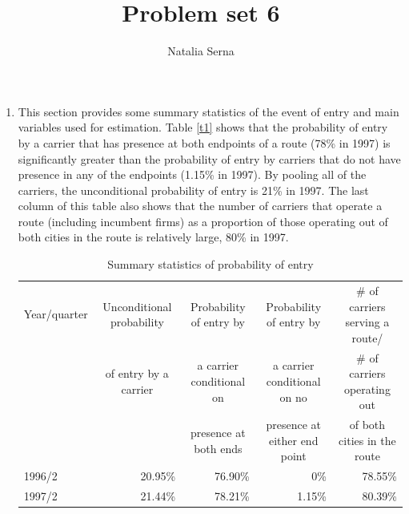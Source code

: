 \documentclass[12pt,english]{article}
\author{
Natalia Serna
   }
\title{Problem set 6}
\date{}
\begin{document}
\maketitle


\begin{enumerate}

\item This section provides some summary statistics of the event of entry and main variables used for estimation. Table \eqref{t1} shows that the probability of entry by a carrier that has presence at both endpoints of a route (78\% in 1997) is significantly greater than the probability of entry by carriers that do not have presence in any of the endpoints (1.15\% in 1997). By pooling all of the carriers, the unconditional probability of entry is 21\% in 1997. The last column of this table also shows that the number of carriers that operate a route (including incumbent firms) as a proportion of those operating out of both cities in the route is relatively large, 80\% in 1997.


\begin{table}[H]
  \centering
  \caption{Summary statistics of probability of entry}
    \begin{tabular}{lrrrr}
    \hline
    \multicolumn{1}{c}{\scriptsize{Year/quarter}} & \multicolumn{1}{c}{\scriptsize{Unconditional probability}} & \multicolumn{1}{c}{\scriptsize{Probability of entry by}} & \multicolumn{1}{c}{\scriptsize{Probability of entry by}} & \multicolumn{1}{c}{\scriptsize{\# of carriers serving a route/}} \\
        \multicolumn{1}{c}{} & \multicolumn{1}{c}{\scriptsize{of entry by a carrier}} & \multicolumn{1}{c}{\scriptsize{a carrier conditional on}} & \multicolumn{1}{c}{\scriptsize{a carrier conditional on no}} & \multicolumn{1}{c}{\scriptsize{\# of carriers operating out}} \\
 \multicolumn{1}{c}{} & \multicolumn{1}{c}{} & \multicolumn{1}{c}{\scriptsize{presence at both ends}} & \multicolumn{1}{c}{\scriptsize{presence at either end point}} & \multicolumn{1}{c}{\scriptsize{of both cities in the route}} \\
    \hline
    1996/2 & 20.95\% & 76.90\% & 0\%   & 78.55\% \\
    1997/2 & 21.44\% & 78.21\% & 1.15\% & 80.39\% \\
    \hline
    \end{tabular}%
  \label{t1}%
\end{table}


\end{enumerate}
\end{document}
